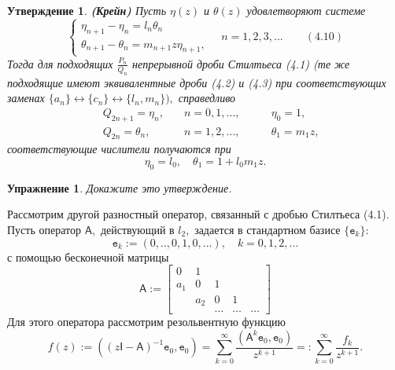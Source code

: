 \documentclass[12pt,a4paper]{article}
\theoremstyle{plain}   \newtheorem{Pro}{Задача}
\newtheorem{Sta}{Утверждение}
\newtheorem{Exe}{Упражнение}
\begin{document}
\begin{Sta}
{\bfseries (Крейн)}
Пусть
$ \eta (z) $
и
$ \theta (z) $
удовлетворяют системе
\begin{equation*}
  \begin{cases}
    \eta _{n+1}-\eta _n =l_n \theta _n \\
	\theta _{n+1}-\theta _n =m_{n+1}z\eta_{n+1},
  \end{cases}
  \quad n=1,2,3,... \qquad (4.10)
\end{equation*}
Тогда для подходящих
$ \frac{P_n}{Q_n} $
непрерывной дроби Стилтьеса (4.1)
(те же подходящие имеют эквивалентные дроби (4.2) и (4.3)
при соответствующих заменах
$ \{ a_n \} \leftrightarrow \{ c_n \} \leftrightarrow \{ l_n , m_n \} ), $
справедливо
\begin{align*}
  \; & Q_{2n+1}=\eta _n , \quad & n=0,1,...,
  \quad \quad & \eta _0 =1, \\
  \; & Q_{2n}=\theta _n , \quad & n=1,2,...,
  \quad \quad & \theta _1 =m_1 z ,
\end{align*}
соответствующие числители получаются при
$$
  \eta _0 =l_0 , \quad \theta _1 =1+l_0 m_1 z .
$$
\end{Sta}
\begin{Exe}
Докажите это утверждение.
\end{Exe}
Рассмотрим другой разностный оператор, связанный с дробью
Стилтьеса (4.1). Пусть оператор
$ \mathsf{A} , $
действующий в
$ l_2 , $
задается в стандартном базисе
$ \{ \mathtt{e}_k \} : $
$$
  \mathtt{e}_k := (0,..,0,1,0,...), \quad k=0,1,2,...
$$
с помощью бесконечной матрицы
\begin{equation*}
  \mathsf{A}:=
    \begin{bmatrix}
	  0 & 1 & \; & \; & \; \\
	  a_1 & 0 & 1 & \; & \; \\
	  \; & a_2 & 0 & 1 \\
	  \; & \; & \dots & \dots & \dots
	\end{bmatrix}
\end{equation*}
Для этого оператора рассмотрим резольвентную функцию
\begin{equation*}
  f(z):=((z\mathsf{I}-\mathsf{A})^{-1}\mathtt{e}_0 ,\mathtt{e}_0 )
  =\sum _{k=0}^{\infty}\frac{(\mathsf{A}^k \mathtt{e}_0 ,
  \mathtt{e}_0 )}{z^{k+1}}=: \sum _{k=0}^{\infty}
  \frac{f_k}{z^{k+1}}.
\end{equation*}
\end{document}
